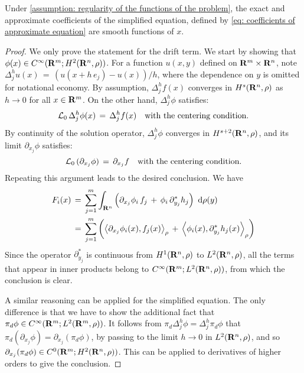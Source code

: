 \begin{lemma}
    Under \cref{assumption: regularity of the functions of the problem}, the
    exact and approximate coefficients of the simplified equation, defined by 
    \cref{eq: coefficients of approximate equation} are smooth functions of $x$.
    \begin{proof}
        We only prove the statement for the drift term. We start by showing
        that $\phi(x) \in C^{\infty}(\mathbf R^m; H^{2}(\mathbf R^n, \rho))$.
        For a function $u(x,y)$ defined on $\mathbf R^m \times \mathbf R^n$, note
        $\Delta^h_j u(x)\,=\, (u(x+h\, e_j) - u(x))/h$, where the dependence on
        $y$ is omitted for notational economy. By assumption, $\Delta^h_j
        f(x)$ converges in $H^{s}(\mathbf R^n, \rho)$ as $h \to 0$ for all
        $x \in \mathbf R^m$. On the other hand, $\Delta^h_j \phi$ satisfies:
        $$ 
            \mathcal L_0 \, \Delta^h_j \phi(x) \,=\, \Delta^h_j f(x) \quad \text{with the centering condition}.
        $$
        By continuity of the solution operator, $\Delta^h_j \phi$ converges in
        $H^{s+2}(\mathbf R^n, \rho) $, and its limit $\partial_{x_j} \phi$ satisfies:
        $$ \mathcal L_0 \, (\partial_{x_j} \phi) \,=\, \partial_{x_j} f \quad
        \text{with the centering condition}.$$ Repeating this argument leads to
        the desired conclusion. We have
        \begin{align*}
            F_i(x) &\,=\, \sum^{m}_{j=1}  \int_{\mathbf R^n} \left(\partial_{x_j}\phi_i
                \, f_j\,+\, \phi_i\, \partial_{y_j}^* h_j\right) \,\,\mathrm d \rho(y) \\
            &\,=\, \sum^{m}_{j=1}
            \left(\left \langle \partial_{x_j}\phi_i(x),f_j(x) \right\rangle_{\rho}
                \,+\,\left \langle \phi_i(x),\partial_{y_j}^*h_j(x) \right\rangle_{\rho}\right) 
        \end{align*}
        Since the operator $\partial_{y_j}^*$ is continuous from
        $H^{1}(\mathbf R^n, \rho)$ to $L^{2}(\mathbf R^n,\rho)$, all the
        terms that appear in inner products belong to $C^{\infty}(\mathbf R^m;
            L^{2}(\mathbf R^n,\rho))$, from which the conclusion is clear. 

        A similar reasoning can be applied for the simplified equation. The only difference 
        is that we have to show the additional fact that $\pi_d \phi \in C^{\infty}(\mathbf R^m;
            L^{2}(\mathbf R^m,\rho))$. It follows from $\pi_d \Delta^h_j \phi =
        \Delta^h_j \pi_d \phi$ that $\pi_d (\partial_{x_j}\phi) =
        \partial_{x_j} (\pi_d \phi)$, by passing to the limit $h \to 0$ in
        $L^{2}(\mathbf R^n,\rho)$, and so $\partial_{x_j} (\pi_d \phi) \in C^{0}(\mathbf R^m;
            H^{2}(\mathbf R^n, \rho))$. This can be applied to derivatives
        of higher orders to give the conclusion. 
    \end{proof}
\end{lemma}
